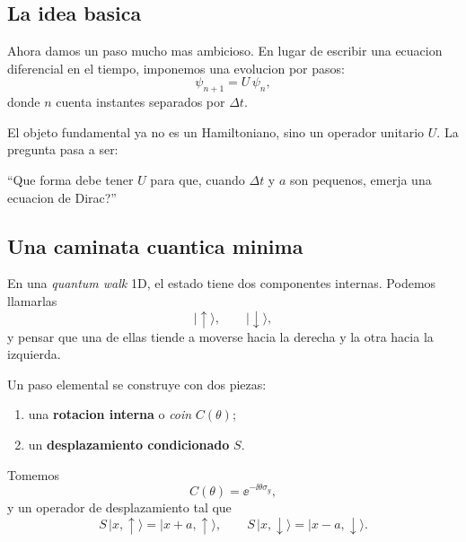 \subsection{La idea basica}

Ahora damos un paso mucho mas ambicioso. En lugar de escribir una ecuacion diferencial en el tiempo, imponemos una evolucion por pasos:
\begin{equation}
\psi_{n+1}=U\,\psi_n,
\label{c21:eq:unitary-step}
\end{equation}
donde \(n\) cuenta instantes separados por \(\Delta t\).

El objeto fundamental ya no es un Hamiltoniano, sino un operador unitario \(U\). La pregunta pasa a ser:

\begin{displayquote}
\enquote{Que forma debe tener \(U\) para que, cuando \(\Delta t\) y \(a\) son pequenos, emerja una ecuacion de Dirac?}
\end{displayquote}

\subsection{Una caminata cuantica minima}

En una \emph{quantum walk} 1D, el estado tiene dos componentes internas. Podemos llamarlas
\begin{equation}
\lvert \uparrow \rangle,\qquad \lvert \downarrow \rangle,
\end{equation}
y pensar que una de ellas tiende a moverse hacia la derecha y la otra hacia la izquierda.

Un paso elemental se construye con dos piezas:

\begin{enumerate}[leftmargin=*]
  \item una \textbf{rotacion interna} o \emph{coin} \(C(\theta)\);
  \item un \textbf{desplazamiento condicionado} \(S\).
\end{enumerate}

Tomemos
\begin{equation}
C(\theta)=\ee^{-\ii \theta \sigma_y},
\end{equation}
y un operador de desplazamiento tal que
\begin{equation}
S\,\lvert x,\uparrow \rangle=\lvert x+a,\uparrow \rangle,
\qquad
S\,\lvert x,\downarrow \rangle=\lvert x-a,\downarrow \rangle.
\end{equation}


